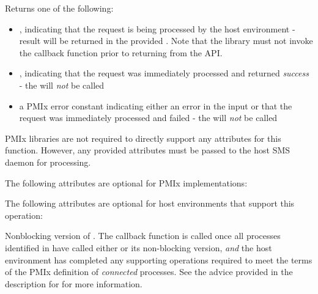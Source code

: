 \begin{arglist}
\end{arglist}

Returns one of the following:

\begin{itemize}
    \item {}, indicating that the request is being processed by the host environment - result will be returned in the provided . Note that the library must not invoke the callback function prior to returning from the \ac{API}.
    \item {}, indicating that the request was immediately processed and returned \textit{success} - the  will \textit{not} be called
    \item a PMIx error constant indicating either an error in the input or that the request was immediately processed and failed - the  will \textit{not} be called
\end{itemize}


\reqattrstart
\ac{PMIx} libraries are not required to directly support any attributes for this function. However, any provided attributes must be passed to the host \ac{SMS} daemon for processing.

\reqattrend

\optattrstart
The following attributes are optional for \ac{PMIx} implementations:



The following attributes are optional for host environments that support this operation:


\optattrend

\descr

Nonblocking version of . The callback function is called once all processes identified in  have called either  or its non-blocking version, \textit{and} the host environment has completed any supporting operations required to meet the terms of the \ac{PMIx} definition of \textit{connected} processes. See the advice provided in the description for  for more information.


